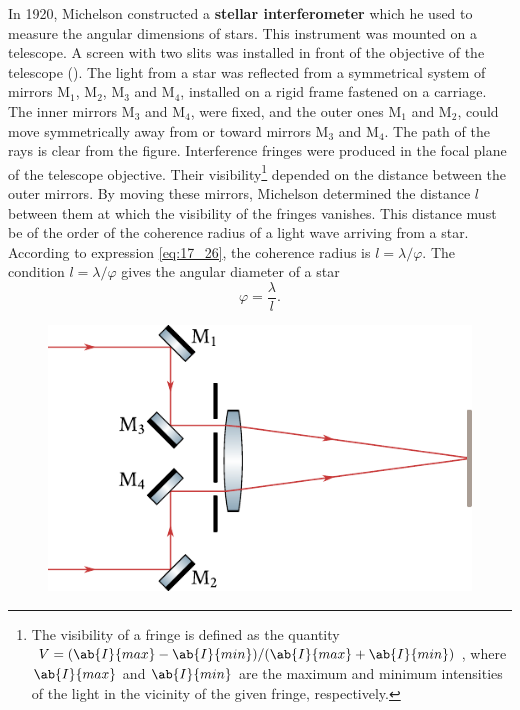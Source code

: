 In 1920, Michelson constructed a \textbf{stellar interferometer} which he used to measure the angular dimensions of stars.
This instrument was mounted on a telescope.
A screen with two slits was installed in front of the objective of the telescope ().
The light from a star was reflected from a symmetrical system of mirrors M$_1$, M$_2$, M$_3$ and M$_4$, installed on a rigid frame fastened on a carriage.
The inner mirrors M$_3$ and M$_4$, were fixed, and the outer ones M$_1$ and M$_2$, could move symmetrically away from or toward mirrors M$_3$ and M$_4$.
The path of the rays is clear from the figure.
Interference fringes were produced in the focal plane of the telescope objective.
Their visibility\footnote{The visibility of a fringe is defined as the quantity $V = (\ab{I}{max}-\ab{I}{min})/(\ab{I}{max}+\ab{I}{min})$, where $\ab{I}{max}$ and $\ab{I}{min}$ are the maximum and minimum intensities of the light in the vicinity of the given fringe, respectively.} depended on the distance between the outer mirrors.
By moving these mirrors, Michelson determined the distance $l$ between them at which the visibility of the fringes vanishes.
This distance must be of the order of the coherence radius of a light wave arriving from a star.
According to expression \eqref{eq:17_26}, the coherence radius is $l=\lambda/\varphi$.
The condition $l=\lambda/\varphi$ gives the angular diameter of a star
\begin{equation*}
    \varphi = \frac{\lambda}{l}.
\end{equation*}

\begin{figure}[!htb]
	\begin{center}
		\includegraphics[scale=0.9]{figures/ch_17/fig_17_17.pdf}
		\caption[]{}
		\label{fig:17_17}
	\end{center}
	\vspace{-0.8cm}
\end{figure}

